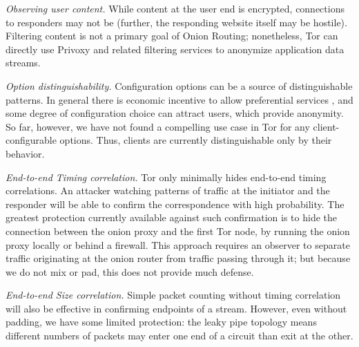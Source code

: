\documentclass[times,10pt,twocolumn]{article}
\begin{document}
\emph{Observing user content.} While content at the user end is encrypted,
connections to responders may not be (further, the responding website
itself may be hostile). Filtering content is not a primary goal of Onion
Routing; nonetheless, Tor can directly use Privoxy and related
filtering services to anonymize application data streams.

\emph{Option distinguishability.} Configuration options can be a
source of distinguishable patterns. In general there is economic
incentive to allow preferential services \cite{econymics}, and some
degree of configuration choice can attract users, which
provide anonymity.  So far, however, we have
not found a compelling use case in Tor for any client-configurable
options.  Thus, clients are currently distinguishable only by their
behavior.
  
\emph{End-to-end Timing correlation.}  Tor only minimally hides
end-to-end timing correlations. An attacker watching patterns of
traffic at the initiator and the responder will be
able to confirm the correspondence with high probability. The
greatest protection currently available against such confirmation is to hide
the connection between the onion proxy and the first Tor node,
by running the onion proxy locally or 
behind a firewall.  This approach
requires an observer to separate traffic originating at the onion
router from traffic passing through it; but because we do not mix
or pad, this does not provide much defense.
  
\emph{End-to-end Size correlation.} Simple packet counting
without timing correlation will also be effective in confirming
endpoints of a stream. However, even without padding, we have some
limited protection: the leaky pipe topology means different numbers
of packets may enter one end of a circuit than exit at the other.
  
\end{document}
